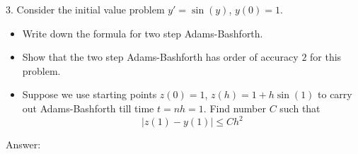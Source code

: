 \documentclass[20pt]{article} %
\theoremstyle{break}
\begin{document}

3. Consider the initial value problem $y'=\sin(y)$, $y(0)=1$.

\begin{itemize}
\item Write down the formula for two step Adams-Bashforth.
\item Show that the two step Adams-Bashforth has order of accuracy $2$ for this problem.
\item Suppose we use starting points $z(0)=1$, $z(h)=1+h\sin(1)$ to carry out Adams-Bashforth till time $t=nh=1$. Find number $C$ such that
  \[|z(1)-y(1)|\leq Ch^2\]
\end{itemize}

Answer:
\end{document}

